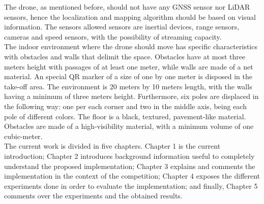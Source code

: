 The drone, as mentioned before, should not have any GNSS sensor nor LiDAR sensors, hence the localization and mapping algorithm should be based on visual information. The sensors allowed sensors are inertial devices, range sensors, cameras and speed sensors, with the possibility of streaming capacity. \\

The indoor environment where the drone should move has specific characteristics with obstacles and walls that delimit the space. Obstacles have at most three meters height with passages of at least one meter, while walls are made of a net material. An special QR marker of a size of one by one meter is disposed in the take-off area. The environment is 20 meters by 10 meters length, with the walls having a minimum of three meters height. Furthermore, six poles are displaced in the following way: one per each corner and two in the middle axis, being each pole of different colors. The floor is a black, textured, pavement-like material. Obstacles are made of a high-visibility material, with a minimum volume of one cubic-meter.\\

The current work is divided in five chapters. Chapter 1 is the current introduction; Chapter 2 introduces background information useful to completely understand the proposed implementation; Chapter 3 explains and comments the implementation in the context of the competition; Chapter 4 exposes the different experiments done in order to evaluate the implementation; and finally, Chapter 5 comments over the experiments and the obtained results.
